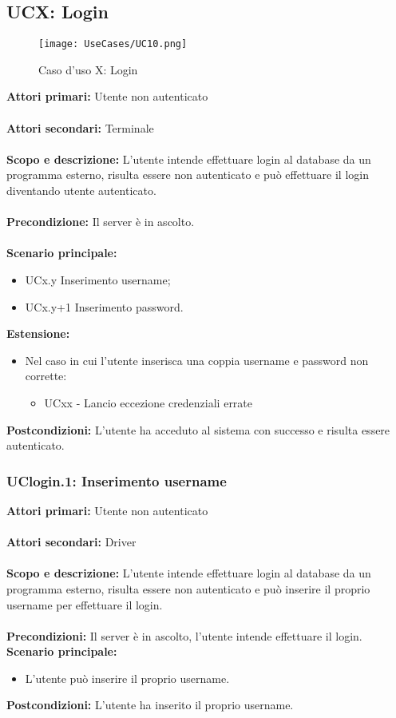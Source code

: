 \documentclass{scalatekids-article}
\begin{document}
\subsection{UCX: Login}

\begin{figure}[H]
  \begin{center}
    \texttt{[image: UseCases/UC10.png]}
    \caption*{Caso d'uso X: Login}
  \end{center}
\end{figure}
\textbf{Attori primari:} Utente non autenticato\\ \\
\textbf{Attori secondari:} Terminale\\ \\
\textbf{Scopo e descrizione:}
L'utente intende effettuare login al database da un programma  esterno, risulta essere non autenticato e può effettuare il login diventando utente autenticato.\\ \\
\textbf{Precondizione:} Il server è in ascolto.\\ \\
\textbf{Scenario principale:}
\begin{itemize}
\item UCx.y Inserimento username;
\item UCx.y+1 Inserimento password.
\end{itemize}
\textbf{Estensione:}
\begin{itemize}
  \item Nel caso in cui l'utente inserisca una coppia username e password non corrette:
  \begin{itemize}
    \item UCxx - Lancio eccezione credenziali errate
  \end{itemize}
\end{itemize}
\textbf{Postcondizioni:} L'utente ha acceduto al sistema con successo e risulta essere autenticato.

\subsubsection{UClogin.1: Inserimento username}

\textbf{Attori primari:} Utente non autenticato\\ \\
\textbf{Attori secondari:} Driver\\ \\
\textbf{Scopo e descrizione:}
L'utente intende effettuare login al database da un programma  esterno, risulta essere non autenticato e può inserire il proprio username per effettuare il login.\\ \\
\textbf{Precondizioni:} Il server è in ascolto, l'utente intende effettuare il login.
\textbf{Scenario principale:}
\begin{itemize}
\item L'utente può inserire il proprio username.
\end{itemize}
\textbf{Postcondizioni:} L'utente ha inserito il proprio username.
\end{document}
